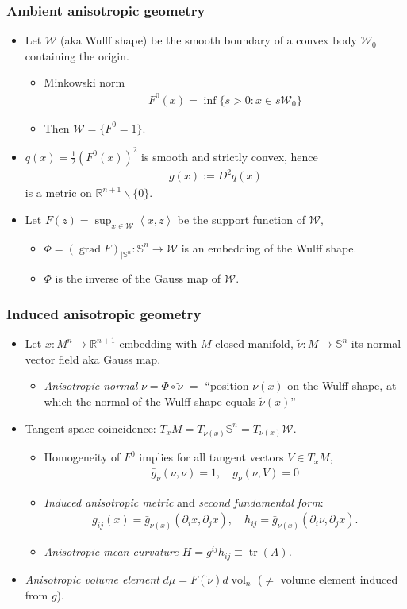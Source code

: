 \documentclass{beamer}
\newcommand{\ti}{\tilde}
\newcommand{\bs}{\backslash}
\newcommand{\cn}{\colon}
\newcommand{\bbR}{\mathbb{R}}
\newcommand{\bbS}{\mathbb{S}}
\newcommand{\8}{\infty}
\newcommand{\cW}{\mathcal{W}}
\newcommand{\del}{\partial}
\newcommand{\ip}[2]{\left\langle #1,#2 \right\rangle}
\newcommand{\fr}[2]{\frac{#1}{#2}}
\DeclareMathOperator{\tr}{tr}
\DeclareMathOperator{\grad}{grad}
\DeclareMathOperator{\vol}{vol}
\newcommand{\eq}[1]{\begin{equation}\begin{alignedat}{2} #1 \end{alignedat}\end{equation}}
\newcommand{\ra}{\rightarrow}
\newcommand{\q}{\quad}
\begin{document}
\begin{frame} 
\frametitle{Ambient anisotropic geometry}

\begin{itemize}
\item Let $\cW$ (aka Wulff shape) be the smooth boundary of a convex body $\cW_{0}$ containing the origin. 
	\begin{itemize}
		\item Minkowski norm
		\eq{F^{0}(x) = \inf\{s>0\cn x\in s\cW_{0}\}}
		\item Then $\cW = \{F^{0}=1\}.$
	\end{itemize}
\item $q(x) = \fr{1}{2}(F^{0}(x))^{2}$ is smooth and strictly convex, hence 
\eq{\bar g(x):=D^{2}q(x)}
is a metric on $\bbR^{n+1}\bs\{0\}$.
\item Let $F(z)=\sup_{x\in \cW}\ip{x}{z}$ be the support function of $\cW$,
	\begin{itemize}
		\item $\Phi = (\grad F)_{|\bbS^{n}}\cn \bbS^{n}\ra \cW$ is an embedding of the Wulff shape.
		\item $\Phi$ is the inverse of the Gauss map of $\cW$.
	\end{itemize}
\end{itemize}
\end{frame}

\begin{frame} 
\frametitle{Induced anisotropic geometry}

\begin{itemize}
\item Let $x\cn M^{n}\ra \bbR^{n+1}$ embedding with $M$ closed manifold, $\ti\nu\cn M\ra \bbS^{n}$ its normal vector field aka Gauss map.
	\begin{itemize}
		\item {\it Anisotropic normal} $\nu = \Phi\circ \ti \nu$ $=$ ``position $\nu(x)$ on the Wulff shape, at which the normal of the Wulff shape equals $\ti\nu(x)$''
	\end{itemize}  
\item Tangent space coincidence: $T_{x}M = T_{\ti\nu(x)}\bbS^{n} = T_{\nu(x)}\cW$.
	\begin{itemize}
		\item Homogeneity of $F^{0}$ implies for all tangent vectors $V\in T_{x}M$,
		\eq{\bar g_{\nu}(\nu,\nu) = 1,\q g_{\nu}(\nu,V) = 0}
		\item {\it Induced anisotropic metric} and {\it second fundamental form}: 
		\eq{g_{ij}(x) = \bar g_{\nu(x)}(\del_{i}x,\del_{j}x),\q h_{ij} = \bar g_{\nu(x)}(\del_{i}\nu,\del_{j}x).}
		\item {\it Anisotropic mean curvature $H = g^{ij}h_{ij} \equiv \tr(A)$.}	
	\end{itemize}
\item {\it Anisotropic volume element} $d\mu = F(\ti \nu)d\vol_{n}$ ($\neq$ volume element induced from $g$).
\end{itemize}
\end{frame}
\end{document}
